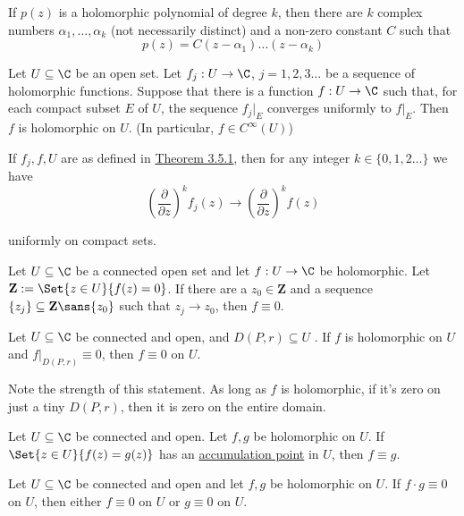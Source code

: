 \label{cae4be0}

If $p(z)$ is a holomorphic polynomial of degree $k$, then there are $k$ complex
numbers $\alpha_1,\ldots,\alpha_k$ (not necessarily distinct) and a non-zero
constant $C$ such that
$$
  p(z)=C(z-\alpha_1)\ldots(z-\alpha_k)
$$

\label{c4e6d08}

Let $U\subseteq\C$ be an open set. Let $f_j:U\to\C$, $j=1,2,3\ldots$ be a
sequence of holomorphic functions. Suppose that there is a function $f:U\to\C$
such that, for each compact subset $E$ of $U$, the sequence $f_j|_E$ converges
uniformly to $f|_E$. Then $f$ is holomorphic on $U$. (In particular, $f\in
C^\infty(U)$)

\label{f5163f1}

If $f_j,f,U$ are as defined in \href{c4e6d08}{Theorem 3.5.1}, then for any
integer $k\in\{0,1,2\ldots\}$ we have
$$
  \left(\frac\partial{\partial z}\right)^kf_j(z)\to\left(\frac\partial{\partial z}\right)^kf(z)
$$

uniformly on compact sets.

\label{bdc2857}

Let $U\subseteq\C$ be a connected open set and let $f:U\to\C$ be holomorphic.
Let $\mathbf Z:=\Set{z\in U}{f(z)=0}$. If there are a $z_0\in\mathbf Z$ and a
sequence $\{z_j\}\subseteq\mathbf Z\sans{z_0}$ such that $z_j\to z_0$, then
$f\equiv0$.

\label{b919101}

Let $U\subseteq\C$ be connected and open, and $D(P,r)\subseteq U$ . If $f$ is
holomorphic on $U$ and $f|_{D(P,r)}\equiv0$, then $f\equiv0$ on $U$.

Note the strength of this statement. As long as $f$ is holomorphic, if it's
zero on just a tiny $D(P,r)$, then it is zero on the entire domain.

\label{ac6f6ea}

Let $U\subseteq\C$ be connected and open. Let $f,g$ be holomorphic on $U$. If
$\Set{z\in U}{f(z)=g(z)}$ has an \href{b0219cd}{accumulation point} in $U$,
then $f\equiv g$.

\label{faf57f7}

Let $U\subseteq\C$ be connected and open and let $f,g$ be holomorphic on $U$.
If $f\cdot g\equiv0$ on $U$, then either $f\equiv0$ on $U$ or $g\equiv0$ on
$U$.

\label{dccfe6b}

